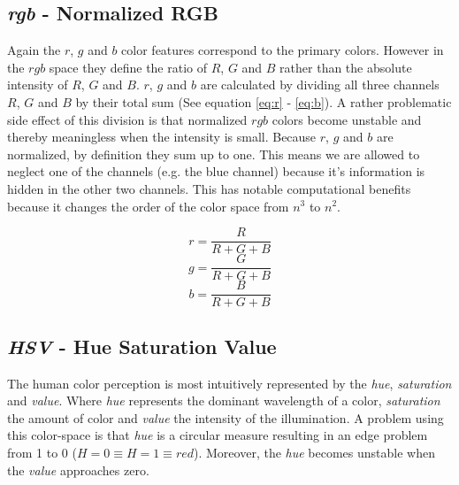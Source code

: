 \documentclass[11pt]{article}
\begin{document}
\subsection{\textit{rgb} - Normalized RGB}
Again the $r$, $g$ and $b$  color features correspond to the primary colors.
However in the $rgb$ space they define the ratio of $R$, $G$ and $B$ rather than
the absolute intensity of $R$, $G$ and $B$. $r$, $g$ and $b$ are calculated by
dividing all three channels $R$, $G$ and $B$ by their total sum (See equation
\ref{eq:r} - \ref{eq:b}). A rather problematic side effect of this division is
that normalized $rgb$ colors become unstable and thereby meaningless when the
intensity is small. Because $r$, $g$ and $b$ are normalized, by definition they
sum up to one. This means we are allowed to neglect one of the channels (e.g.
the blue channel) because it's information is hidden in the other two channels.
This has notable computational benefits because it changes the order of the
color space from $n^3$ to $n^2$.

\begin{equation}
  r = \frac{R}{R+G+B}
  \label{eq:r}
\end{equation}
\begin{equation}
  g = \frac{G}{R+G+B}
  \label{eq:g}
\end{equation}
\begin{equation}
  b = \frac{B}{R+G+B}
  \label{eq:b}
\end{equation}

\subsection{\textit{HSV} - Hue Saturation Value}
The human color perception is most intuitively represented by the \emph{hue},
\emph{saturation} and \emph{value}. Where \emph{hue} represents the dominant
wavelength of a color, \emph{saturation} the amount of color and \emph{value}
the intensity of the illumination. A problem using this color-space is that
\emph{hue} is a circular measure resulting in an edge problem from 1 to 0 ($H =
0 \equiv H = 1 \equiv red$).  Moreover, the \emph{hue} becomes unstable when
the \emph{value} approaches zero.
\end{document}
